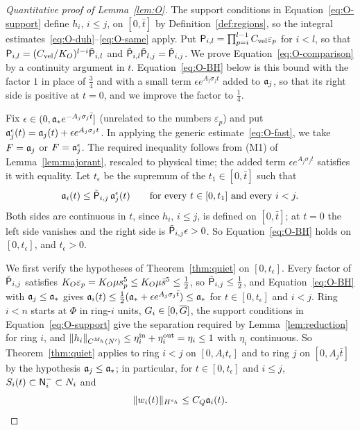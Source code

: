 \begin{proof}[Quantitative proof of Lemma~\ref{lem:O}]
The support conditions in Equation~\eqref{eq:O-support} define $h_i$,
$i\le j$, on $[0,\bar t]$ by Definition~\ref{def:regions}, so the
integral estimates~\eqref{eq:O-duh}--\eqref{eq:O-same} apply.
Put $\mathsf{P}_{i,l}=\prod_{p=i}^{l-1}C_{\mathrm{vel}} \varepsilon_p$ for $i<l$, so that
$\mathsf{P}_{i,l}=(C_{\mathrm{vel}} /K_{O})^{l-i}\tilde{\mathsf{P}}_{i,l}$ and
$\tilde{\mathsf{P}}_{i,l}\tilde{\mathsf{P}}_{l,j}=\tilde{\mathsf{P}}_{i,j}$.
We prove Equation~\eqref{eq:O-comparison} by a continuity argument in $t$.
Equation~\eqref{eq:O-BH} below is this bound with the factor $1$ in place of
$\frac34$ and with a small term $\epsilon e^{A_j\sigma_jt}$ added to $\mathfrak{a}_j$, so
that its right side is positive at $t=0$, and we improve the factor to $\frac14$.

Fix $\epsilon\in(0,\mathfrak{a}_* e^{-A_j\sigma_j\bar t}]$ (unrelated to the numbers
$\varepsilon_p$) and put $\mathfrak{a}^\epsilon_j(t)=\mathfrak{a}_j(t)+\epsilon e^{A_j\sigma_jt}$.
In applying the generic estimate~\eqref{eq:O-fast}, we take $F=\mathfrak{a}_j$ or
$F=\mathfrak{a}^\epsilon_j$. The required inequality follows from (M1) of
Lemma~\ref{lem:majorant}, rescaled to physical time; the added term
$\epsilon e^{A_j\sigma_jt}$ satisfies it with equality.
Let $t_\epsilon$ be the supremum of
the $t_1\in[0,\bar t]$ such that
\begin{equation}
\label{eq:O-BH}
\mathfrak{a}_i(t)\le\tilde{\mathsf{P}}_{i,j}\,\mathfrak{a}^\epsilon_j(t)\qquad\text{for every }t\in[0,t_1]\text{ and every }i<j .
\end{equation}
Both sides are continuous in $t$, since $h_i$, $i\le j$, is defined on
$[0,\bar t]$; at $t=0$ the left side vanishes and the right side is
$\tilde{\mathsf{P}}_{i,j}\epsilon>0$. So Equation~\eqref{eq:O-BH} holds on $[0,t_\epsilon]$, and
$t_\epsilon>0$.

We first verify the hypotheses of Theorem~\ref{thm:quiet} on $[0,t_\epsilon]$.
Every factor of $\tilde{\mathsf{P}}_{i,j}$ satisfies
$K_{O}\varepsilon_p=K_{O}\mu s_p^5\le K_{O}\mu\bar s^5\le\frac12$, so
$\tilde{\mathsf{P}}_{i,j}\le\frac12$, and Equation~\eqref{eq:O-BH} with $\mathfrak{a}_j\le\mathfrak{a}_*$ gives
$\mathfrak{a}_i(t)\le\frac12(\mathfrak{a}_*+\epsilon e^{A_j\sigma_j\bar t})\le\mathfrak{a}_*$ for
$t\in[0,t_\epsilon]$ and $i<j$. Ring $i<n$ starts at $\Phi$ in ring-$i$ units,
$G_i\in[0,\overline{G}]$, the support conditions in Equation~\eqref{eq:O-support}
give the separation required by Lemma~\ref{lem:reduction} for ring $i$, and
$\|h_i\|_{C^{M_h}(N')}\le\eta^{\mathrm{in}}_i+\eta^{\mathrm{out}}_i=\eta_i\le1$ with $\eta_i$ continuous. So
Theorem~\ref{thm:quiet} applies to ring $i<j$ on $[0,A_it_\epsilon]$ and to ring
$j$ on $[0,A_j\bar t]$ by the hypothesis $\mathfrak{a}_j\le\mathfrak{a}_*$; in particular, for $t\in[0,t_\epsilon]$ and $i\le j$,
$S_i(t)\subset\mathsf{N}^{-}_i\subset N_i$ and
\begin{equation}
\label{eq:O-Q}
\|w_i(t)\|_{H^{s_h}}\le C_Q\mathfrak{a}_i(t).
\end{equation}


\end{proof}
